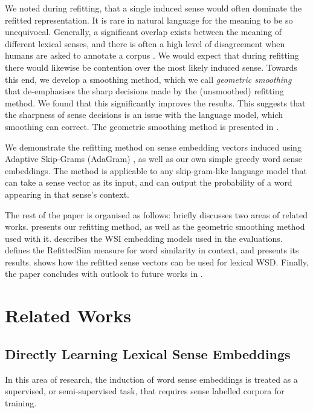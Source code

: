 \documentclass{article}
\def\parencite{\cite}
\begin{document}
We noted during refitting, that a single induced sense would often dominate the refitted representation.
It is rare in natural language for the meaning to be so unequivocal.
Generally, a significant overlap exists between the meaning of different lexical senses, and there is often a high level of disagreement when humans are asked to annotate a corpus \parencite{veronis1998study}.
We would expect that during refitting there would likewise be contention over the most likely induced sense.
Towards this end, we develop a smoothing method, which we call \emph{geometric smoothing} that de-emphasises the sharp decisions made by the (unsmoothed) refitting method.
We found that this significantly improves the results.
This suggests that the sharpness of sense decisions is an issue with the language model, which smoothing can correct.
The geometric smoothing method is presented in .


We demonstrate the refitting method on sense embedding vectors induced using Adaptive Skip-Grams (AdaGram) \parencite{AdaGrams}, as well as our own simple greedy word sense embeddings.
The method is applicable to any skip-gram-like language model that can take a sense vector as its input, and can output the probability of a word appearing in that sense's context.


The rest of the paper is organised as follows:  briefly discusses two areas of related works.
 presents our refitting method, as well as the geometric smoothing method used with it.
 describes the WSI embedding models used in the evaluations.
 defines the RefittedSim measure for word similarity in context, and presents its results.
 shows how the refitted sense vectors can be used for lexical WSD.
Finally, the paper concludes with outlook to future works in .

\section{Related Works} \label{relatedwords}

\subsection{Directly Learning Lexical Sense Embeddings}
In this area of research, the induction of word sense embeddings is treated as a supervised, or semi-supervised task, that requires sense labelled corpora for training.
\end{document}
